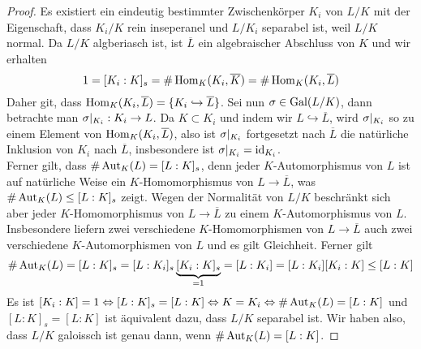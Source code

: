 \documentclass{scrartcl}
\begin{document}
    \begin{proof}
        Es existiert ein eindeutig bestimmter Zwischenkörper $K_i$ von $L/K$ mit der Eigenschaft, dass $K_i/K$ rein inseperanel und $L/K_i$ separabel ist, weil $L/K$ normal. 
        Da $L/K$ algberiasch ist, ist $\overline{L}$ ein algebraischer Abschluss von $K$ und wir erhalten 
        \[
        1 = [K_i:K]_s = \#\operatorname{Hom}_K(K_i,\overline{K}) = \#\operatorname{Hom}_K(K_i,\overline{L})    
        \]
        Daher git, dass $\operatorname{Hom}_K(K_i,\overline{L})=\{K_i\hookrightarrow \overline{L}\}$. Sei nun $\sigma\in \operatorname{Gal}(L/K)$, dann betrachte man $\sigma|_{K_i}:K_i\to L$. Da $K\subset K_i$ und indem wir $L\hookrightarrow \overline{L}$, wird $\sigma|_{K_i}$ so zu einem Element von $\operatorname{Hom}_K(K_i,\overline{L})$, also ist $\sigma|_{K_i}$ fortgesetzt nach $\overline{L}$ die natürliche Inklusion von $K_i$ nach $\overline{L}$, insbesondere ist $\sigma|_{K_i}=\operatorname{id}_{K_i}$. \\
        Ferner gilt, dass $\#\operatorname{Aut}_K(L)=[L:K]_s$, denn jeder $K$-Automorphismus von $L$ ist auf natürliche Weise ein $K$-Homomorphismus von $L\to \overline{L}$, was $\#\operatorname{Aut}_K(L)\le [L:K]_s$ zeigt. Wegen der Normalität von 
        $L/K$ beschränkt sich aber jeder $K$-Homomorphismus von $L\to \overline{L}$ zu einem $K$-Automorphismus von $L$. Insbesondere liefern zwei verschiedene $K$-Homomorphismen von $L\to \overline{L}$ auch zwei verschiedene $K$-Automorphismen von $L$ und es gilt Gleichheit. Ferner gilt 
        \[
        \#\operatorname{Aut}_K(L) = [L:K]_s = [L:K_i]_s \underbrace{[K_i:K]_s}_{=1} = [L:K_i] = [L:K_i][K_i:K]\le [L:K]    
        \] 
        Es ist $[K_i:K]=1 \Leftrightarrow [L:K]_s = [L:K] \Leftrightarrow K=K_i \Leftrightarrow \#\operatorname{Aut}_K(L) = [L:K]$ und $[L:K]_s=[L:K]$ ist äquivalent dazu, dass $L/K$ separabel ist. Wir haben also, dass $L/K$ galoissch ist genau dann, wenn $\#\operatorname{Aut}_K(L)=[L:K]$. 
    \end{proof}
\end{document}

